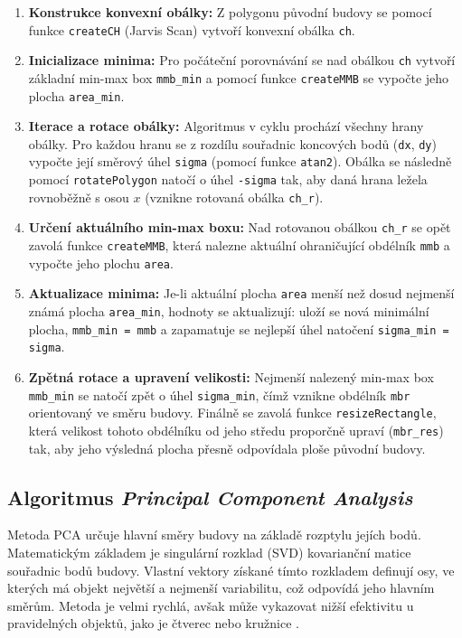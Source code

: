 \documentclass[12pt, a4paper]{article}
\begin{document}
\begin{enumerate}
    \item \textbf{Konstrukce konvexní obálky:} Z polygonu původní budovy se pomocí funkce \texttt{createCH} (Jarvis Scan) vytvoří konvexní obálka \texttt{ch}.
    \item \textbf{Inicializace minima:} Pro počáteční porovnávání se nad obálkou \texttt{ch} vytvoří základní min-max box \texttt{mmb\_min} a pomocí funkce \texttt{createMMB} se vypočte jeho plocha \texttt{area\_min}.
    \item \textbf{Iterace a rotace obálky:} Algoritmus v cyklu prochází všechny hrany obálky. Pro každou hranu se z rozdílu souřadnic koncových bodů (\texttt{dx}, \texttt{dy}) vypočte její směrový úhel \texttt{sigma} (pomocí funkce \texttt{atan2}). Obálka se následně pomocí \texttt{rotatePolygon} natočí o úhel \texttt{-sigma} tak, aby daná hrana ležela rovnoběžně s osou $x$ (vznikne rotovaná obálka \texttt{ch\_r}).
    \item \textbf{Určení aktuálního min-max boxu:} Nad rotovanou obálkou \texttt{ch\_r} se opět zavolá funkce \texttt{createMMB}, která nalezne aktuální ohraničující obdélník \texttt{mmb} a vypočte jeho plochu \texttt{area}.
    \item \textbf{Aktualizace minima:} Je-li aktuální plocha \texttt{area} menší než dosud nejmenší známá plocha \texttt{area\_min}, hodnoty se aktualizují: uloží se nová minimální plocha, \texttt{mmb\_min = mmb} a zapamatuje se nejlepší úhel natočení \texttt{sigma\_min = sigma}.
    \item \textbf{Zpětná rotace a upravení velikosti:} Nejmenší nalezený min-max box \texttt{mmb\_min} se natočí zpět o úhel \texttt{sigma\_min}, čímž vznikne obdélník \texttt{mbr} orientovaný ve směru budovy. Finálně se zavolá funkce \texttt{resizeRectangle}, která velikost tohoto obdélníku od jeho středu proporčně upraví (\texttt{mbr\_res}) tak, aby jeho výsledná plocha přesně odpovídala ploše původní budovy.
\end{enumerate}

\subsection{Algoritmus \textit{Principal Component Analysis}}
Metoda PCA určuje hlavní směry budovy na základě rozptylu jejích bodů. Matematickým základem je singulární rozklad (SVD) kovarianční matice souřadnic bodů budovy. Vlastní vektory získané tímto rozkladem definují osy, ve kterých má objekt největší a nejmenší variabilitu, což odpovídá jeho hlavním směrům. Metoda je velmi rychlá, avšak může vykazovat nižší efektivitu u pravidelných objektů, jako je čtverec nebo kružnice \parencite{bayer}.
\end{document}
